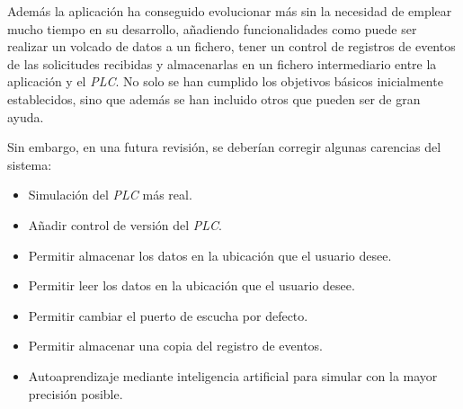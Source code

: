 \documentclass[pdftex,11pt,a4paper]{book}
\begin{document}
Además la aplicación ha conseguido evolucionar más sin la necesidad de emplear mucho tiempo en su desarrollo, añadiendo funcionalidades como puede ser realizar un volcado de datos a un fichero, tener un control de registros de eventos de las solicitudes recibidas y almacenarlas en un fichero intermediario entre la aplicación y el \emph{PLC}. No solo se han cumplido los objetivos básicos inicialmente establecidos, sino que además se han incluido otros que pueden ser de gran ayuda.

Sin embargo, en una futura revisión, se deberían corregir algunas carencias del sistema:
\begin{itemize}
\item Simulación del \emph{PLC} más real.
\item Añadir control de versión del \emph{PLC}.
\item Permitir almacenar los datos en la ubicación que el usuario desee.
\item Permitir leer los datos en la ubicación que el usuario desee.
\item Permitir cambiar el puerto de escucha por defecto.
\item Permitir almacenar una copia del registro de eventos.
\item Autoaprendizaje mediante inteligencia artificial para simular con la mayor precisión posible.
\end{itemize}


%
%
\end{document}
